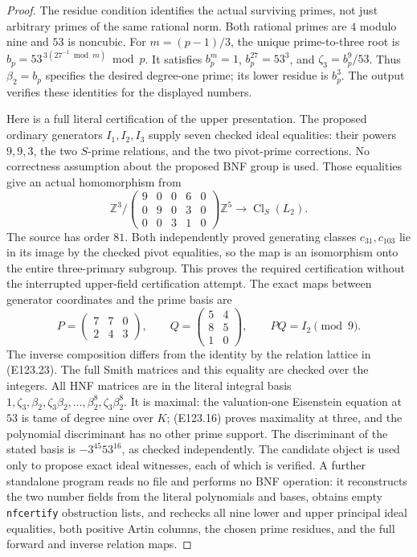 \begin{proof}
The residue condition identifies the actual surviving primes,
not just arbitrary primes of the same rational norm.
Both rational primes are $4$ modulo nine and $53$ is noncubic.
For $m=(p-1)/3$, the unique prime-to-three root is
$b_p=53^{\,3(27^{-1}\bmod m)}\bmod p$.
It satisfies $b_p^m=1$, $b_p^{27}=53^3$, and
$\zeta_3=b_p^9/53$. Thus $\beta_2=b_p$ specifies the desired
degree-one prime; its lower residue is $b_p^3$.
The output verifies these identities for the displayed numbers.

Here is a full literal certification of the upper presentation.
The proposed ordinary generators $I_1,I_2,I_3$ supply seven
checked ideal equalities: their powers $9,9,3$, the two $S$-prime
relations, and the two pivot-prime corrections.
No correctness assumption about the proposed BNF group is used.
Those equalities give an actual homomorphism from
\[
 \mathbb Z^3/
 \begin{pmatrix}9&0&0&6&0\\0&9&0&3&0\\0&0&3&1&0\end{pmatrix}
       \mathbb Z^5
 \longrightarrow\operatorname{Cl}_S(L_2).
 \tag{E123.23}
\]
The source has order $81$. Both independently proved generating
classes $c_{31},c_{103}$ lie in its image by the checked pivot
equalities, so the map is an isomorphism onto the entire
three-primary subgroup. This proves the required certification
without the interrupted upper-field certification attempt.
The exact maps between generator coordinates and the prime basis are
\[
 P=\begin{pmatrix}7&7&0\\2&4&3\end{pmatrix},\qquad
 Q=\begin{pmatrix}5&4\\8&5\\1&0\end{pmatrix},\qquad
 PQ=I_2\pmod9 .
 \tag{E123.24}
\]
The inverse composition differs from the identity by the relation
lattice in (E123.23). The full Smith matrices and this equality
are checked over the integers. All HNF matrices are in the
literal integral basis
$1,\zeta_3,\beta_2,\zeta_3\beta_2,\ldots,\beta_2^8,
\zeta_3\beta_2^8$.
It is maximal: the valuation-one Eisenstein equation at $53$
is tame of degree nine over $K$; (E123.16) proves maximality at
three, and the polynomial discriminant has no other prime support.
The discriminant of the stated basis is $-3^{45}53^{16}$,
as checked independently. The candidate object is used only to
propose exact ideal witnesses, each of which is verified.
A further standalone program reads no file and performs no BNF
operation: it reconstructs the two number fields from the literal
polynomials and bases, obtains empty \texttt{nfcertify} obstruction
lists, and rechecks all nine lower and upper principal ideal
equalities, both positive Artin columns, the chosen prime residues,
and the full forward and inverse relation maps.


\end{proof}
